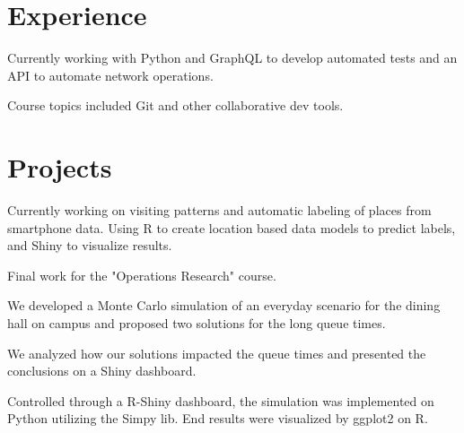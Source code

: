 \documentclass[]{deedy-resume-openfont}
\begin{document}
\begin{minipage}[t]{0.66\textwidth} 


\section{Experience}
\vspace{\topsep}
\begin{tightemize}
\item Currently working with Python and GraphQL to develop automated tests and an API to automate network operations. 
\end{tightemize}
\sectionsep
{}
\vspace{\topsep}
\begin{tightemize}
\item Course topics included Git and other collaborative dev tools.
\end{tightemize}
\sectionsep

\section{Projects}

\descript{}
\begin{tightemize}
\item Currently working on visiting patterns and
automatic labeling of places from smartphone data. Using R to create location based data models to predict labels, and Shiny to visualize results.
\end{tightemize}
\sectionsep

\begin{tightemize}
\item Final work for the "Operations Research" course.
\item We developed a Monte Carlo simulation of an everyday scenario for the dining hall on campus and proposed two solutions for the long queue times.
\item We analyzed how our solutions impacted the queue times and presented the conclusions on a Shiny dashboard.
\item Controlled through a R-Shiny dashboard, the simulation was implemented on Python utilizing the Simpy lib. End results were visualized by ggplot2 on R.
\end{tightemize}
\sectionsep


\end{minipage}
\end{document}
